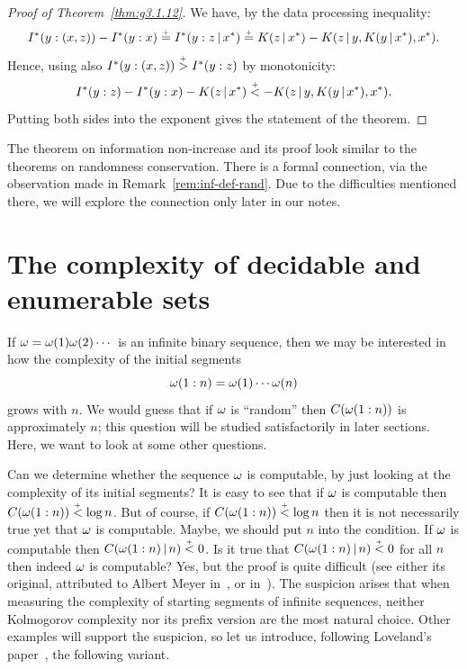  \begin{proof}[Proof of Theorem~\protect\ref{thm:g3.1.12}]
  \leanok
We have, by the data processing inequality:
 \[
 I^{*}(y : (x, z)) - I^{*}(y : x) 
   \stackrel{{}_+}{=} I^{*}(y : z \,\vert\, x^{*}) 
   \stackrel{{}_+}{=} K(z \,\vert\, x^{*}) - K(z \,\vert\, y, K(y \,\vert\, x^{*}), x^{*}).
 \]
Hence, using also \( I^{*}(y: (x, z)) \stackrel{{}_+}{>} I^{*}(y : z) \) by monotonicity:
 \[
 I^{*}(y : z) - I^{*}(y : x) - K(z \,\vert\, x^{*}) 
   \stackrel{{}_+}{<} - K(z \,\vert\, y, K(y \,\vert\, x^{*}), x^{*}).
 \]
Putting both sides into the exponent gives the statement of the theorem.
 \end{proof}

\begin{remark}
  \label{rem:g3.1.17}
The theorem on information non-increase and its proof look similar to
the theorems on randomness conservation.
There is a formal connection, via the observation made in
Remark~\ref{rem:inf-def-rand}.
Due to the difficulties mentioned there, we will explore the connection
only later in our notes.
\end{remark}


\section{The complexity of decidable and enumerable sets}\label{sec:halting}

If \( \omega = \omega(1)\omega(2)\dotsb \) is an infinite binary sequence, then we may
be interested in how the complexity of the initial segments
 \[
  \omega(1:n) = \omega(1) \dotsb \omega(n)
 \]
grows with \( n \).
We would guess that if \( \omega \) is ``random'' then \( C(\omega(1:n)) \) is
approximately \( n \); this question will be studied satisfactorily in later
sections.
Here, we want to look at some other questions.

Can we determine whether the sequence \( \omega \) is computable, by just looking
at the complexity of its initial segments?
It is easy to see that if \( \omega \) is computable then 
\( C(\omega(1:n)) \stackrel{{}_+}{<} \log n \).
But of course, if \( C(\omega(1:n)) \stackrel{{}_+}{<} \log n \) then it is not necessarily true
yet that \( \omega \) is computable.
Maybe, we should put \( n \) into the condition.
If \( \omega \) is computable then \( C(\omega(1:n) \,\vert\, n) \stackrel{{}_+}{<} 0 \).
Is it true that \( C(\omega(1:n) \,\vert\, n) \stackrel{{}_+}{<} 0 \) for all \( n \) then indeed
\( \omega \) is computable?
Yes, but the proof is quite difficult (see either its original, attributed
to Albert Meyer in~\cite{Loveland69}, or in~\cite{ZvLe70}).
The suspicion arises that when
measuring the complexity of starting segments of infinite sequences,
neither Kolmogorov complexity nor its prefix version are the most natural
choice.
Other examples will support the suspicion, so let us introduce, following
Loveland's paper~\cite{Loveland69}, the following variant. 

